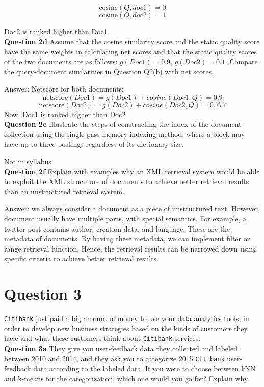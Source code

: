 \documentclass[11pt,a4paper]{report}
\begin{document}
\begin{multicols*}{2}
$$\text{cosine}(Q, doc1) = 0$$
$$\text{cosine}(Q, doc2) = 1$$

\noindent Doc2 is ranked higher than Doc1\\

\noindent \textbf{Question 2d} Assume that the cosine similarity score and the static quality score have the same weights in calculating net scores and that the static quality scores of the two documents are as follows: $g(Doc1)=0.9$, $g(Doc2)=0.1$. Compare the query-document similarities in Question Q2(b) with net scores.

\noindent Answer: Netscore for both documents:
$$\text{netscore}(Doc1) = g(Doc1) + cosine(Doc1, Q) = 0.9$$
$$\text{netscore}(Doc2) = g(Doc2) + cosine(Doc2, Q) = 0.777$$
\noindent Now, Doc1 is ranked higher than Doc2 \\

\noindent \textbf{Question 2e} Illustrate the steps of constructing the index of the document collection using the single-pass memory indexing method, where a block may have up to three postings regardless of its dictionary size. 

\noindent Not in syllabus \\

\noindent \textbf{Question 2f} Explain with examples why an XML retrieval system would be able to exploit the XML strucuture of documents to achieve better retrieval results than an unstructured retrieval system. 

\noindent Answer: we always consider a document as a piece of unstructured text. However, document usually have multiple parts, with special semantics. For example, a twitter post contains author, creation data, and language. These are the metadata of documents. By having these metadata, we can implement filter or range retrieval function. Hence, the retrieval results can be narrowed down using specific criteria to achieve better retrieval results. 

\section{Question 3}

\verb|Citibank| just paid a big amount of money to use your data analytics tools, in order to develop new business strategies based on the kinds of customers they have and what these customers think about \verb|Citibank| services.\\

\noindent \textbf{Question 3a} They give you user-feedback data they collected and labeled between 2010 and 2014, and they ask you to categorize 2015 \verb|Citibank| user-feedback data according to the labeled data. If you were to choose between kNN and k-means for the categorization, which one would you go for? Explain why. 


\end{multicols*}
\end{document}
